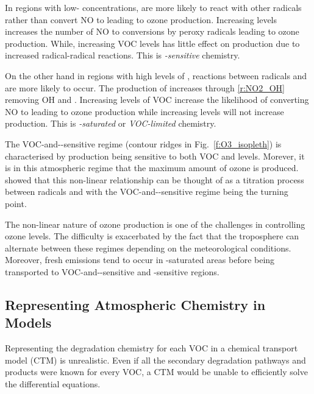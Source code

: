 In regions with low- concentrations,  are more likely to react with other radicals rather than convert NO to  leading to ozone production.
Increasing  levels increases the number of NO to  conversions by peroxy radicals leading to ozone production.
While, increasing VOC levels has little effect on  production due to increased radical-radical reactions.
This is \emph{-sensitive} chemistry.  

On the other hand in regions with high levels of , reactions between radicals and  are more likely to occur.
The production of  increases through \eqref{r:NO2_OH} removing OH and .
Increasing levels of VOC increase the likelihood of  converting NO to  leading to ozone production while increasing  levels will not increase  production.  
This is \emph{-saturated} or \emph{VOC-limited} chemistry.

The VOC-and--sensitive regime (contour ridges in Fig.~\ref{f:O3_isopleth}) is characterised by  production being sensitive to both VOC and  levels. 
Morever, it is in this atmospheric regime that the maximum amount of ozone is produced.
\citet{Kleinman:1994} showed that this non-linear relationship can be thought of as a titration process between radicals and  with the VOC-and--sensitive regime being the turning point.

The non-linear nature of ozone production is one of the challenges in controlling ozone levels.
The difficulty is exacerbated by the fact that the troposphere can alternate between these regimes depending on the meteorological conditions.
Moreover, fresh emissions tend to occur in -saturated areas before being transported to VOC-and--sensitive and -sensitive regions.

\subsection{Representing Atmospheric Chemistry in Models} \label{ss:chemistry_models}
Representing the degradation chemistry for each VOC in a chemical transport model (CTM) is unrealistic.
Even if all the secondary degradation pathways and products were known for every VOC, a CTM would be unable to efficiently solve the differential equations.

